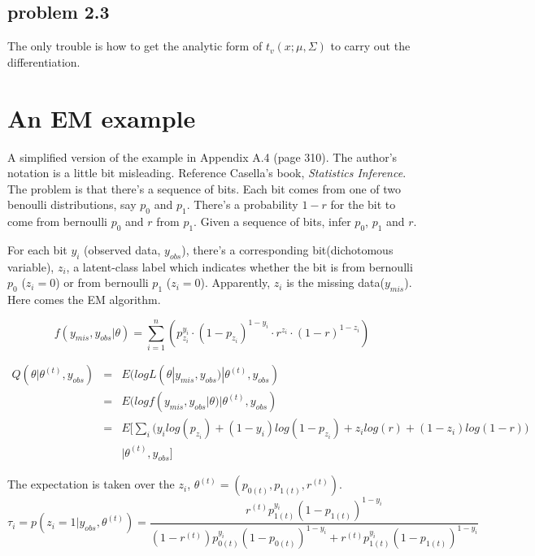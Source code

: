 \documentclass[a4paper,10pt]{article}
\begin{document}
\subsection{problem 2.3}
The only trouble is how to get the analytic form of $t_v(x; \mu, \Sigma)$ to carry out the differentiation.

\section{An EM example}
A simplified version of the example in Appendix A.4 (page 310). The author's notation is a little bit misleading. Reference Casella's book, \emph{Statistics Inference}.
The problem is that there's a sequence of bits. Each bit comes from one of two benoulli distributions, say $p_0$ and $p_1$. There's a probability $1-r$ for the bit to come from bernoulli $p_0$ and $r$ from $p_1$. Given a sequence of bits, infer $p_0$, $p_1$ and $r$.

For each bit $y_i$ (observed data, $y_{obs}$), there's a corresponding bit(dichotomous variable), $z_i$, a latent-class label which indicates whether the bit is from bernoulli $p_0$ ($z_i=0$) or from bernoulli $p_1$ ($z_i=0$). Apparently, $z_i$ is the missing data($y_{mis}$). Here comes the EM algorithm.

\begin{displaymath}
f(y_{mis}, y_{obs} | \theta) = \sum_{i=1}^n(p_{z_i}^{y_i}\cdot(1-p_{z_i})^{1-y_i} \cdot r^{z_i} \cdot (1-r)^{1-z_i})
\end{displaymath}

\begin{eqnarray*}
Q(\theta | \theta^{(t)}, y_{obs} ) & = & E(log L(\theta |y_{mis}, y_{obs}) | \theta^{(t)}, y_{obs} ) \\
& = & E(log f(y_{mis}, y_{obs} | \theta ) | \theta^{(t)}, y_{obs} ) \\
& = & E\biggl[\sum_i \biggl(y_i log(p_{z_i}) + (1-y_i)log(1-p_{z_i}) + z_i log(r) + (1-z_i)log(1-r) \biggr) \\
& & | \theta^{(t)}, y_{obs} \biggr]
\end{eqnarray*}

The expectation is taken over the $z_i$, $\theta^{(t)} = (p_{0(t)}, p_{1(t)}, r^{(t)} )$.
\begin{displaymath}
\tau_i = p(z_i=1 | y_{obs}, \theta^{(t)}) =  \frac{r^{(t)} p_{1(t)}^{y_i} (1-p_{1(t)})^{1-y_i} } {(1-r^{(t)}) p_{0(t)}^{y_i} (1-p_{0(t)})^{1-y_i} + r^{(t)} p_{1(t)}^{y_i} (1-p_{1(t)})^{1-y_i} }
\end{displaymath}
\end{document}
